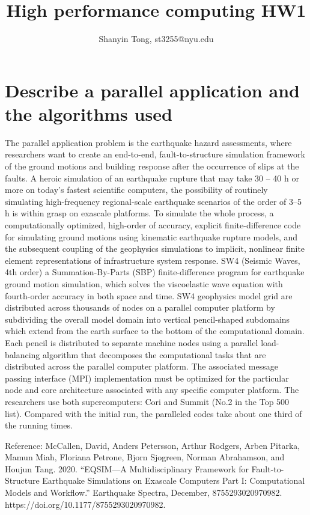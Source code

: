 \documentclass[10pt,a4paper]{article}
\theoremstyle{dotlessP}
\begin{document}
\title{High performance computing HW1}
\author{Shanyin Tong, st3255@nyu.edu}

\maketitle

\section{Describe a parallel application and the algorithms used}
The parallel application problem is the earthquake hazard assessments, where researchers want to create an end-to-end, fault-to-structure simulation framework of the ground motions and building response after the occurrence of slips at the faults. A heroic simulation of an earthquake rupture that may take 30 – 40 h or more on today’s fastest scientific computers, the possibility of routinely simulating high-frequency regional-scale earthquake scenarios of the order of 3–5 h is within grasp on exascale platforms. To simulate the whole process, a computationally optimized, high-order of accuracy, explicit finite-difference code for simulating ground motions using kinematic earthquake rupture models, and the subsequent coupling of the geophysics simulations to implicit, nonlinear finite element representations of infrastructure system response. SW4 (Seismic Waves, 4th order) a Summation-By-Parts (SBP) finite-difference program for earthquake ground motion simulation, which solves the viscoelastic wave equation with fourth-order accuracy in both space and time. SW4 geophysics model grid are distributed across thousands of nodes on a parallel computer platform by subdividing the overall model domain into vertical pencil-shaped subdomains which extend from the earth surface to the bottom of the computational domain. Each pencil is distributed to separate machine nodes using a parallel load-balancing algorithm that decomposes the computational tasks that are distributed across the parallel computer platform. The associated message passing interface (MPI) implementation must be optimized for the particular node and core architecture associated with any specific computer platform. The researchers use both supercomputers: Cori and Summit (No.2 in the Top 500 list). Compared with the initial run, the paralleled codes take about one third of the running times.

Reference: McCallen, David, Anders Petersson, Arthur Rodgers, Arben Pitarka, Mamun Miah, Floriana Petrone, Bjorn Sjogreen, Norman Abrahamson, and Houjun Tang. 2020. “EQSIM—A Multidisciplinary Framework for Fault-to-Structure Earthquake Simulations on Exascale Computers Part I: Computational Models and Workflow.” Earthquake Spectra, December, 8755293020970982. https://doi.org/10.1177/8755293020970982.
\end{document}
